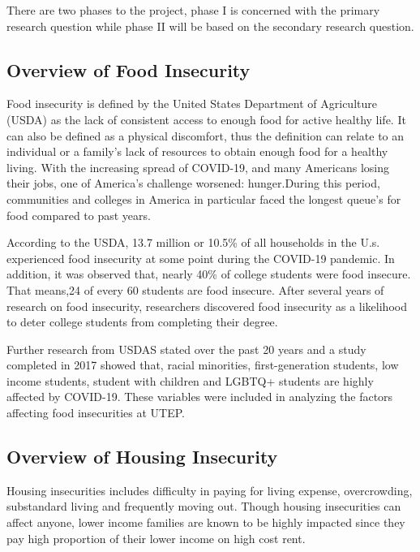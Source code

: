 \documentclass[
  10pt,
]{article}
\begin{document}
There are two phases to the project, phase I is concerned with the primary research question while phase II will be based on the secondary research question.

\hypertarget{overview-of-food-insecurity}{%
\subsection{Overview of Food Insecurity}\label{overview-of-food-insecurity}}

Food insecurity is defined by the United States Department of Agriculture (USDA) as the lack of consistent access to enough food for active healthy life. It can also be defined as a physical discomfort, thus the definition can relate to an individual or a family's lack of resources to obtain enough food for a healthy living. With the increasing spread of COVID-19, and many Americans losing their jobs, one of America's challenge worsened: hunger.During this period, communities and colleges in America in particular faced the longest queue's for food compared to past years.

According to the USDA, 13.7 million or 10.5\% of all households in the U.s. experienced food insecurity at some point during the COVID-19 pandemic. In addition, it was observed that, nearly 40\% of college students were food insecure. That means,24 of every 60 students are food insecure. After several years of research on food insecurity, researchers discovered food insecurity as a likelihood to deter college students from completing their degree.

Further research from USDAS stated over the past 20 years and a study completed in 2017 showed that, racial minorities, first-generation students, low income students, student with children and LGBTQ+ students are highly affected by COVID-19. These variables were included in analyzing the factors affecting food insecurities at UTEP.

\hypertarget{overview-of-housing-insecurity}{%
\subsection{Overview of Housing Insecurity}\label{overview-of-housing-insecurity}}

Housing insecurities includes difficulty in paying for living expense, overcrowding, substandard living and frequently moving out. Though housing insecurities can affect anyone, lower income families are known to be highly impacted since they pay high proportion of their lower income on high cost rent.
\end{document}
